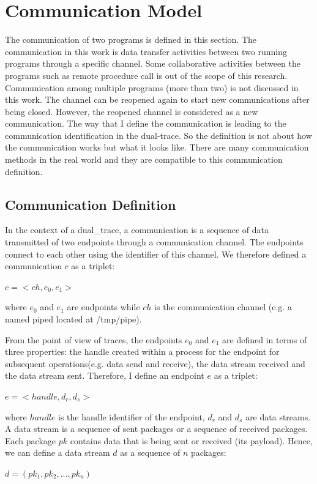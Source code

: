 \section{Communication Model}\label{definition}
The communication of two programs is defined in this section. The communication in this work is data transfer activities between two running programs through a specific channel. Some collaborative activities between the programs such as remote procedure call is out of the scope of this research. Communication among multiple programs (more than two) is not discussed in this work. The channel can be reopened again to start new communications after being closed. However, the reopened channel is considered as a new communication. The way that I define the communication is leading to the communication identification in the dual-trace. So the definition is not about how the communication works but what it looks like. There are many communication methods in the real world and they are compatible to this communication definition. 

\subsection{Communication Definition}
In the context of a dual\_trace, a communication is a sequence of data transmitted of two endpoints through a communication channel. The endpoints connect to each other using the identifier of this channel. We therefore defined a communication $c$ as a triplet:

$c =<ch, e_0, e_1>$

where $e_0$ and $e_1$ are endpoints while $ch$ is the communication channel (e.g. a named piped located at /tmp/pipe).

From the point of view of traces, the endpoints $e_0$ and $e_1$ are defined in terms of three properties: the handle created within a process for the endpoint for subsequent operations(e.g. data send and receive), the data stream received and the data stream sent. Therefore, I define an endpoint $e$ as a triplet:

$ e =<handle, d_r, d_s>$

where $handle$ is the handle identifier of the endpoint, $d_r$ and $d_s$ are data streams. A data stream is a sequence of sent packages or a sequence of received packages. Each package $pk$ contains data that is being sent or received (its payload). Hence, we can define a data stream $d$ as a sequence of $n$ packages:

$ d = (pk_1, pk_2, ..., pk_n)$ 

